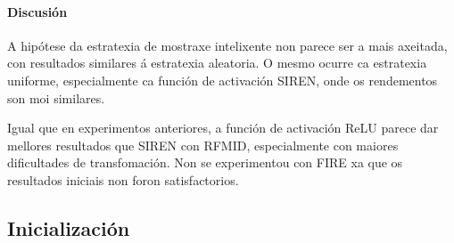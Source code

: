




\FloatBarrier

\paragraph{Discusión}
\label{par:Discusion-sampling}

A hipótese da estratexia de mostraxe intelixente non parece ser a mais axeitada, con resultados similares á estratexia aleatoria. 
O mesmo ocurre ca estratexia uniforme, especialmente ca función de activación SIREN, onde os rendementos son moi similares.

Igual que en experimentos anteriores, a función de activación ReLU parece dar mellores resultados que SIREN con RFMID, especialmente con maiores dificultades de transfomación.
Non se experimentou con FIRE xa que os resultados iniciais non foron satisfactorios.


\subsection{Inicialización}
\label{subsec:Inicialización}

